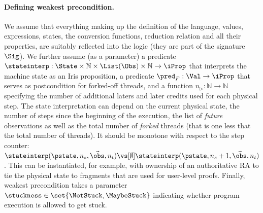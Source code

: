 \paragraph{Defining weakest precondition.}
We assume that everything making up the definition of the language, \ie values, expressions, states, the conversion functions, reduction relation and all their properties, are suitably reflected into the logic (\ie they are part of the signature $\Sig$).
We further assume (as a parameter) a predicate $\stateinterp : \State \times \mathbb N \times \List(\Obs) \times \mathbb N \to \iProp$ that interprets the machine state as an Iris proposition, a predicate $\pred_F: \Val \to \iProp$ that serves as postcondition for forked-off threads, and a function $n_\rhd: \mathbb N \to \mathbb N$ specifying the number of additional laters and later credits used for each physical step.
The state interpretation can depend on the current physical state, the number of steps since the beginning of the execution, the list of \emph{future} observations as well as the total number of \emph{forked} threads (that is one less that the total number of threads).
It should be monotone with respect to the step counter: $\stateinterp(\pstate, n_s, \vec\obs, n_t) \vs[\emptyset] \stateinterp(\pstate, n_s + 1, \vec\obs, n_t)$.
This can be instantiated, for example, with ownership of an authoritative RA to tie the physical state to fragments that are used for user-level proofs.
Finally, weakest precondition takes a parameter $\stuckness \in \set{\NotStuck, \MaybeStuck}$ indicating whether program execution is allowed to get stuck.

